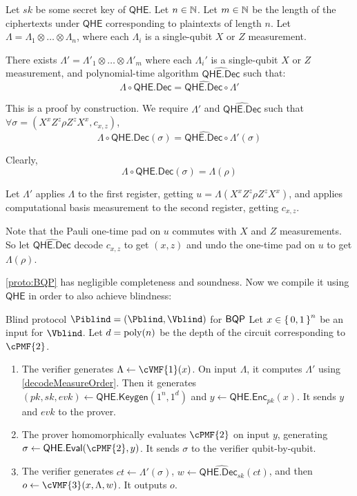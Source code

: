 \begin{thm}
	\label{decodeMeasureOrder}
	Let $sk$ be some secret key of $\mathsf{QHE}$.
	Let $n\in\mathbb{N}$.
	Let $m\in\mathbb{N}$ be the length of the ciphertexts under $\mathsf{QHE}$ corresponding to plaintexts of length $n$.
	Let $\Lambda=\Lambda_1\otimes\ldots\otimes\Lambda_n$, where each $\Lambda_i$ is a single-qubit $X$ or $Z$ measurement.

	There exists $\Lambda'=\Lambda'_1\otimes\ldots\otimes\Lambda'_m$ where each $\Lambda_i'$ is a single-qubit $X$ or $Z$ measurement, and polynomial-time algorithm $\widehat{\mathsf{QHE.Dec}}$ such that:
	$$\Lambda\circ\mathsf{QHE.Dec}=\widehat{\mathsf{QHE.Dec}}\circ\Lambda'$$
\end{thm}
\begin{prf}
	This is a proof by construction.
	We require $\Lambda'$ and $\widehat{\mathsf{QHE.Dec}}$ such that $\forall\sigma=(X^xZ^z\rho Z^zX^x, c_{x,z})$,
	$$\Lambda\circ\mathsf{QHE.Dec}(\sigma)=\widehat{\mathsf{QHE.Dec}}\circ\Lambda'(\sigma)$$

	Clearly,
	$$\Lambda\circ\mathsf{QHE.Dec}(\sigma)=\Lambda(\rho)$$
	
	Let $\Lambda'$ applies $\Lambda$ to the first register, getting $u=\Lambda(X^xZ^z\rho Z^zX^x)$, and applies computational basis measurement to the second register, getting $c_{x, z}$.

	Note that the Pauli one-time pad on $u$ commutes with $X$ and $Z$ measurements.
	So let $\widehat{\mathsf{QHE.Dec}}$ decode $c_{x, z}$ to get $(x, z)$ and undo the one-time pad on $u$ to get $\Lambda(\rho)$.
\end{prf}

\cref{proto:BQP} has negligible completeness and soundness.
Now we compile it using $\mathsf{QHE}$ in order to also achieve blindness:

\begin{protocol}{Blind protocol $\Piblind = (\Pblind, \Vblind)$ for $\operatorname{\mathsf{BQP}}$}
	\label{proto:BlindBQP}
	Let $x\in\set{0,1}^n$ be an input for $\Vblind$.
	Let $d=\operatorname*{\operatorname{poly}}(n)$ be the depth of the circuit corresponding to $\cPMF{2}$.
	\begin{enumerate}
		\item The verifier generates $\Lambda\leftarrow\cVMF{1}(x)$.
			On input $\Lambda$, it computes $\Lambda'$ using \cref{decodeMeasureOrder}.
			Then it generates $(pk, sk, evk)\leftarrow\mathsf{QHE.Keygen}(1^n, 1^d)$ and $y\leftarrow\mathsf{QHE.Enc}_{pk}(x)$.
			It sends $y$ and $evk$ to the prover.
		\item The prover homomorphically evaluates $\cPMF{2}$ on input $y$, generating $\sigma\leftarrow\mathsf{QHE.Eval}(\cPMF{2}, y)$.
			It sends $\sigma$ to the verifier qubit-by-qubit.
		\item The verifier generates $ct\leftarrow\Lambda'(\sigma)$,
			$w\leftarrow\widehat{\mathsf{QHE.Dec}_{sk}}(ct)$,
			and then $o\leftarrow\cVMF{3}(x, \Lambda, w)$.
			It outputs $o$.
	\end{enumerate}
\end{protocol}

